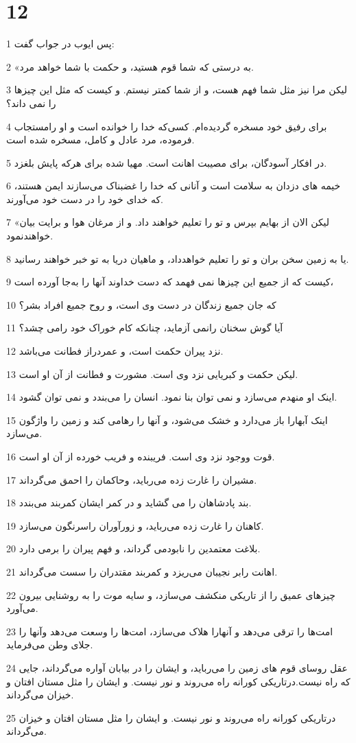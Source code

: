 \chapter{12}

\par 1 پس ایوب در جواب گفت:
\par 2 «به درستی که شما قوم هستید، و حکمت با شما خواهد مرد.
\par 3 لیکن مرا نیز مثل شما فهم هست، و از شما کمتر نیستم. و کیست که مثل این چیزها را نمی داند؟
\par 4 برای رفیق خود مسخره گردیده‌ام. کسی‌که خدا را خوانده است و او رامستجاب فرموده، مرد عادل و کامل، مسخره شده است.
\par 5 در افکار آسودگان، برای مصیبت اهانت است. مهیا شده برای هرکه پایش بلغزد.
\par 6 خیمه های دزدان به سلامت است و آنانی که خدا را غضبناک می‌سازند ایمن هستند، که خدای خود را در دست خود می‌آورند.
\par 7 «لیکن الان از بهایم بپرس و تو را تعلیم خواهند داد. و از مرغان هوا و برایت بیان خواهندنمود.
\par 8 یا به زمین سخن بران و تو را تعلیم خواهدداد، و ماهیان دریا به تو خبر خواهند رسانید.
\par 9 کیست که از جمیع این چیزها نمی فهمد که دست خداوند آنها را به‌جا آورده است،
\par 10 که جان جمیع زندگان در دست وی است، و روح جمیع افراد بشر؟
\par 11 آیا گوش سخنان رانمی آزماید، چنانکه کام خوراک خود رامی چشد؟
\par 12 نزد پیران حکمت است، و عمردراز فطانت می‌باشد.
\par 13 لیکن حکمت و کبریایی نزد وی است. مشورت و فطانت از آن او است.
\par 14 اینک او منهدم می‌سازد و نمی توان بنا نمود. انسان را می‌بندد و نمی توان گشود.
\par 15 اینک آبهارا باز می‌دارد و خشک می‌شود، و آنها را رهامی کند و زمین را واژگون می‌سازد.
\par 16 قوت ووجود نزد وی است. فریبنده و فریب خورده از آن او است.
\par 17 مشیران را غارت زده می‌رباید، وحاکمان را احمق می‌گرداند.
\par 18 بند پادشاهان را می گشاید و در کمر ایشان کمربند می‌بندد.
\par 19 کاهنان را غارت زده می‌رباید، و زورآوران راسرنگون می‌سازد.
\par 20 بلاغت معتمدین را نابودمی گرداند، و فهم پیران را برمی دارد.
\par 21 اهانت رابر نجیبان می‌ریزد و کمربند مقتدران را سست می‌گرداند.
\par 22 چیزهای عمیق را از تاریکی منکشف می‌سازد، و سایه موت را به روشنایی بیرون می‌آورد.
\par 23 امت‌ها را ترقی می‌دهد و آنهارا هلاک می‌سازد، امت‌ها را وسعت می‌دهد وآنها را جلای وطن می‌فرماید.
\par 24 عقل روسای قوم های زمین را می‌رباید، و ایشان را در بیابان آواره می‌گرداند، جایی که راه نیست.درتاریکی کورانه راه می‌روند و نور نیست. و ایشان را مثل مستان افتان و خیزان می‌گرداند.
\par 25 درتاریکی کورانه راه می‌روند و نور نیست. و ایشان را مثل مستان افتان و خیزان می‌گرداند.
 
